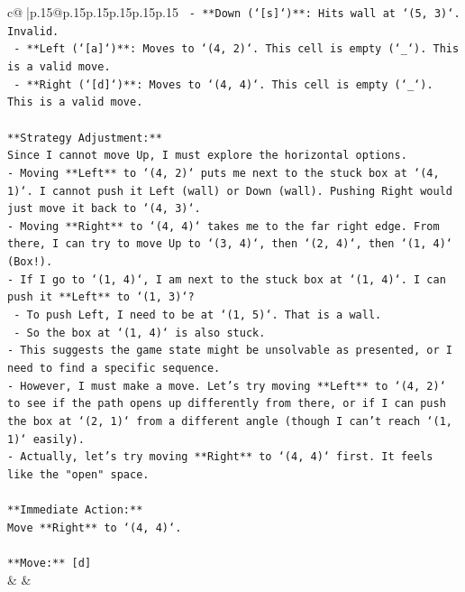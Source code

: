 \documentclass{article}
\begin{document}
{\begin{supertabular}{c@{$\;$}|p{.15\linewidth}@{}p{.15\linewidth}p{.15\linewidth}p{.15\linewidth}p{.15\linewidth}p{.15\linewidth}}
{{{\texttt{    {-} **Down (`{[}s{]}`)**: Hits wall at `(5, 3)`. Invalid.} \\
\texttt{    {-} **Left (`{[}a{]}`)**: Moves to `(4, 2)`. This cell is empty (`\_`). This is a valid move.} \\
\texttt{    {-} **Right (`{[}d{]}`)**: Moves to `(4, 4)`. This cell is empty (`\_`). This is a valid move.} \\
\\ 
\texttt{**Strategy Adjustment:**} \\
\texttt{Since I cannot move Up, I must explore the horizontal options.} \\
\texttt{{-} Moving **Left** to `(4, 2)` puts me next to the stuck box at `(4, 1)`. I cannot push it Left (wall) or Down (wall). Pushing Right would just move it back to `(4, 3)`.} \\
\texttt{{-} Moving **Right** to `(4, 4)` takes me to the far right edge. From there, I can try to move Up to `(3, 4)`, then `(2, 4)`, then `(1, 4)` (Box!).} \\
\texttt{{-} If I go to `(1, 4)`, I am next to the stuck box at `(1, 4)`. I can push it **Left** to `(1, 3)`?} \\
\texttt{    {-} To push Left, I need to be at `(1, 5)`. That is a wall.} \\
\texttt{    {-} So the box at `(1, 4)` is also stuck.} \\
\texttt{{-} This suggests the game state might be unsolvable as presented, or I need to find a specific sequence.} \\
\texttt{{-} However, I must make a move. Let's try moving **Left** to `(4, 2)` to see if the path opens up differently from there, or if I can push the box at `(2, 1)` from a different angle (though I can't reach `(1, 1)` easily).} \\
\texttt{{-} Actually, let's try moving **Right** to `(4, 4)` first. It feels like the "open" space.} \\
\\ 
\texttt{**Immediate Action:**} \\
\texttt{Move **Right** to `(4, 4)`.} \\
\\ 
\texttt{**Move:** {[}d{]}} \\
            }
        }
    }
    & & \\ \\


\end{supertabular}}
\end{document}
